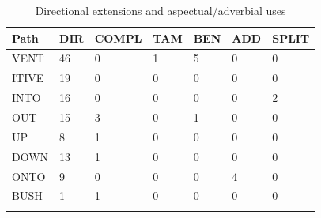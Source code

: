 \begin{table}
	\caption{Directional extensions and aspectual/adverbial uses}
	\label{tab:DIR_gram}
	\begin{tabular}{lllllll} %
		\lsptoprule
		Path &  DIR &  COMPL &  TAM &  BEN &  ADD &  SPLIT \\
		\midrule
		VENT &   46 &      0 &    1 &    5 &    0 &      0 \\
		ITIVE &   19 &      0 &    0 &    0 &    0 &      0 \\
		INTO &   16 &      0 &    0 &    0 &    0 &      2 \\
		OUT &   15 &      3 &    0 &    1 &    0 &      0 \\
		UP &    8 &      1 &    0 &    0 &    0 &      0 \\
		DOWN &   13 &      1 &    0 &    0 &    0 &      0 \\
		ONTO &    9 &      0 &    0 &    0 &    4 &      0 \\
		BUSH &    1 &      1 &    0 &    0 &    0 &      0 \\
		\lspbottomrule
	\end{tabular}
\end{table}